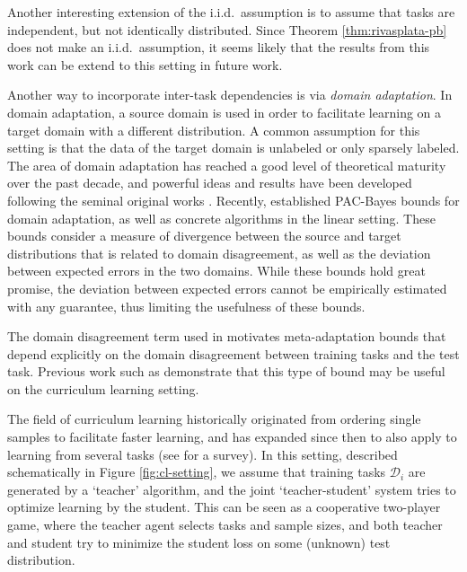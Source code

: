\documentclass{article}
\theoremstyle{definition}
\begin{document}
Another interesting extension of the i.i.d.\ assumption is to assume that tasks are independent, but not identically distributed. Since Theorem \ref{thm:rivasplata-pb} \citep{Rivasplata2020} does not make an i.i.d.\ assumption, it seems likely that the results from this work can be extend to this setting in future work.

Another way to incorporate inter-task dependencies is via \emph{domain adaptation}. In domain adaptation, a source domain is used in order to facilitate learning on a target domain with a different distribution. A common assumption for this setting is that the data of the target domain is unlabeled or only sparsely labeled. 
The area of domain adaptation has reached a good level of theoretical maturity over the past
decade, and powerful ideas and results have been developed following the seminal original works \citep{Ben-David2010, Mansour2009}. Recently, \citet{Germain2020} established PAC-Bayes bounds for domain adaptation, as well as concrete algorithms in the linear setting. 
These bounds consider a measure of divergence between the source and target distributions that is related to domain disagreement, as well as the deviation between expected errors in the two domains. While these bounds hold great promise, the deviation between expected errors cannot be empirically estimated with any guarantee, thus limiting the usefulness of these bounds.

The domain disagreement term used in \citet{Germain2020} motivates meta-adaptation bounds that depend explicitly on the domain disagreement between training tasks and the test task. Previous work such as \citet{Pentina2015} demonstrate that this type of bound may be useful on the curriculum learning setting.

The field of curriculum learning \citep{Bengio2009} historically originated from ordering single samples to facilitate faster learning, and has expanded since then to also apply to learning from several tasks (see \citet{Soviany2021} for a survey). In this setting, described schematically in Figure \ref{fig:cl-setting}, we assume that training tasks $\mathcal{D}_i$ are generated by a `teacher' algorithm, and the joint `teacher-student' system tries to optimize learning by the student. This can be seen as a cooperative two-player game, where the teacher agent selects tasks and sample sizes, and both teacher and student try to minimize the student loss on some (unknown) test distribution. 
\end{document}
